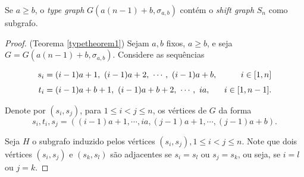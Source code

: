 \begin{teorema}\label{typetheorem1}
Se $a\geq b$, o \textit{type graph} $G(a(n-1)+b, \sigma_{a,b})$ contém o \textit{shift graph} $S_n$ como subgrafo.
\end{teorema}

\begin{proof}(Teorema \ref{typetheorem1})
Sejam $a,b$ fixos, $a \geq b$, e seja $G = G(a(n-1)+b, \sigma_{a,b})$. Considere as sequências

\begin{equation*}
\setlength{\jot}{6pt}
\begin{aligned}
s_i &= (i-1)a+1,\ (i-1)a+2,\ \cdots,\ (i-1)a+b, & i\in [1,n] \\
t_i &= (i-1)a+b+1,\ (i-1)a+b+2,\ \cdots,\ ia, & i\in [1,n-1].
\end{aligned}
\end{equation*}

Denote por $(s_i,s_j)$, para $1\leq i < j \leq n$, os vértices de $G$ da forma \[s_i,t_i,s_j = ((i-1)a+1,\cdots, ia, (j-1)a+1,\cdots, (j-1)a+b).\]

    
    

Seja $H$ o subgrafo induzido pelos vértices $(s_i,s_j), 1\leq i<j\leq n$. Note que dois vértices $(s_i,s_j)$ e $(s_k,s_l)$ são adjacentes se $s_i = s_l$ ou $s_j = s_k$, ou seja, se $i=l$ ou $j=k$.



\end{proof}
